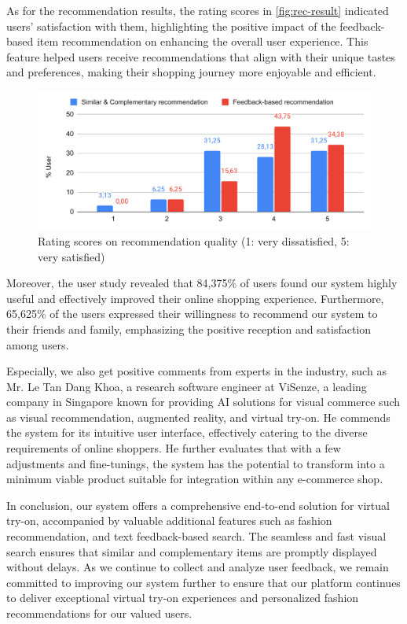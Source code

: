 As for the recommendation results, the rating scores in \autoref{fig:rec-result} indicated users' satisfaction with them, highlighting the positive impact of the feedback-based item recommendation on enhancing the overall user experience. This feature helped users receive recommendations that align with their unique tastes and preferences, making their shopping journey more enjoyable and efficient.

\begin{figure}[h!]
  \centering
  \includegraphics[width=0.8\linewidth]{content/resources/images/application/exp-user-rec-result.pdf}
  \caption{Rating scores on recommendation quality (1: very dissatisfied, 5: very satisfied)}
  \label{fig:rec-result}
\end{figure}

Moreover, the user study revealed that 84,375\% of users found our system highly useful and effectively improved their online shopping experience. Furthermore, 65,625\% of the users expressed their willingness to recommend our system to their friends and family, emphasizing the positive reception and satisfaction among users. 

Especially, we also get positive comments from experts in the industry, such as Mr. Le Tan Dang Khoa, a research software engineer at ViSenze, a leading company in Singapore known for providing AI solutions for visual commerce such as visual recommendation, augmented reality, and virtual try-on. He commends the system for its intuitive user interface, effectively catering to the diverse requirements of online shoppers. He further evaluates that with a few adjustments and fine-tunings, the system has the potential to transform into a minimum viable product suitable for integration within any e-commerce shop.

In conclusion, our system offers a comprehensive end-to-end solution for virtual try-on, accompanied by valuable additional features such as fashion recommendation, and text feedback-based search. The seamless and fast visual search ensures that similar and complementary items are promptly displayed without delays. As we continue to collect and analyze user feedback, we remain committed to improving our system further to ensure that our platform continues to deliver exceptional virtual try-on experiences and personalized fashion recommendations for our valued users.


